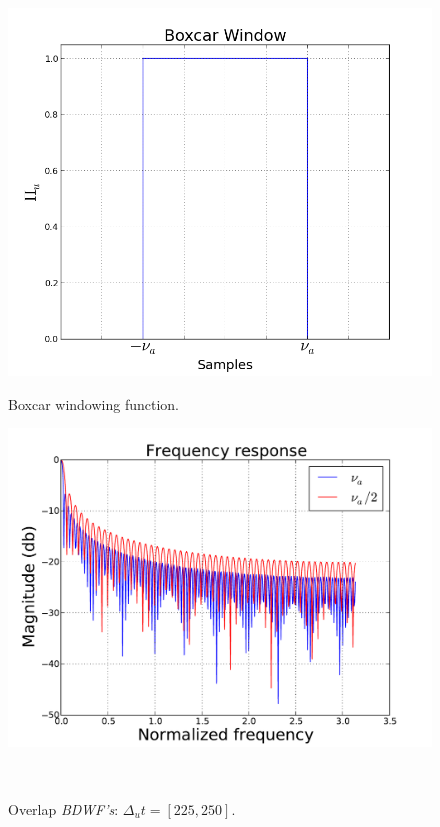 \documentclass[useAMS,usenatbib]{mn2e}
\begin{document}
\\
\\
\\
\begin{figure}
  \centering
  \begin{minipage}{0.36\linewidth}\includegraphics[width=1\textwidth]{./Figures/rect.png}\caption{Boxcar windowing 
function.}\label{fig:fig_box}\end{minipage}
\begin{minipage}{0.36\linewidth}\includegraphics[width=1\textwidth]{./Figures/freq_resp_box.pdf}\caption{Overlap 
		\textit{BDWF's}: $\Delta_u t= [225, 250]$.}\label{fig:fig_box_freq}\end{minipage}\\

\end{figure}
\end{document}
